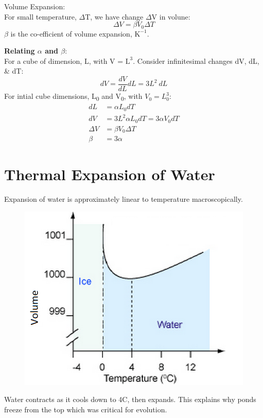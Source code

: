 \documentclass[a4paper, 11pt, normalem]{report}
\begin{document}
Volume Expansion:\\
For small temperature, $\Delta$T, we have change $\Delta$V in volune:
\begin{equation}
    {\Delta}V = {\beta}V_{0}{\Delta}T
\end{equation}
$\beta$ is the co-efficient of volume expansion, $\text{K}^{-1}$.

\textbf{Relating ${\alpha}$ and ${\beta}$}:\\
For a cube of dimension, L, with V = $\text{L}^{3}$.
Consider infinitesimal changes dV, dL, \& dT:
\begin{equation}
	dV = \dfrac{dV}{dL}dL = 3L^{2}~dL
\end{equation}
For intial cube dimensions, L\textsubscript{0} and V\textsubscript{0}, with $V_{0} = L_{0}^{3}$:
\begin{align}
    dL &= {\alpha}L_{0}dT \\
    dV &= 3L^{2}{\alpha}L_{0}dT = 3{\alpha}V_{0}dT \\
    {\Delta}V &= {\beta}V_{0}{\Delta}T \\
    \beta &= 3\alpha
\end{align}

\section{Thermal Expansion of Water}
Expansion of water is approximately linear to temperature macroscopically.
\begin{figure}[H]
    \centering
    \includegraphics[scale=0.4]{water.png}
\end{figure}
Water contracts as it cools down to 4{\textdegree}C, then expands. 
This explains why ponds freeze from the top which was critical for evolution.
\end{document}
